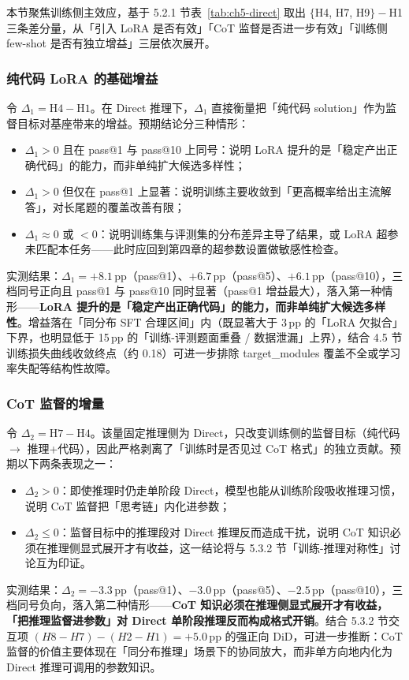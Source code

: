 
本节聚焦训练侧主效应，基于 5.2.1 节表~\ref{tab:ch5-direct} 取出 $\{$H4, H7, H9$\} - $H1 三条差分量，从「引入 LoRA 是否有效」「CoT 监督是否进一步有效」「训练侧 few-shot 是否有独立增益」三层依次展开。

\subsubsection{纯代码 LoRA 的基础增益}
令 $\Delta_1 = \mathrm{H4} - \mathrm{H1}$。在 Direct 推理下，$\Delta_1$ 直接衡量把「纯代码 solution」作为监督目标对基座带来的增益。预期结论分三种情形：
\begin{itemize}
    \item $\Delta_1 > 0$ 且在 pass@1 与 pass@10 上同号：说明 LoRA 提升的是「稳定产出正确代码」的能力，而非单纯扩大候选多样性；
    \item $\Delta_1 > 0$ 但仅在 pass@1 上显著：说明训练主要收敛到「更高概率给出主流解答」，对长尾题的覆盖改善有限；
    \item $\Delta_1 \approx 0$ 或 $< 0$：说明训练集与评测集的分布差异主导了结果，或 LoRA 超参未匹配本任务——此时应回到第四章的超参数设置做敏感性检查。
\end{itemize}
实测结果：$\Delta_1 = +8.1$\,pp（pass@1）、$+6.7$\,pp（pass@5）、$+6.1$\,pp（pass@10），三档同号正向且 pass@1 与 pass@10 同时显著（pass@1 增益最大），落入第一种情形——\textbf{LoRA 提升的是「稳定产出正确代码」的能力，而非单纯扩大候选多样性}。增益落在「同分布 SFT 合理区间」内（既显著大于 3\,pp 的「LoRA 欠拟合」下界，也明显低于 15\,pp 的「训练-评测题面重叠 / 数据泄漏」上界），结合 4.5 节训练损失曲线收敛终点（约 0.18）可进一步排除 target\_modules 覆盖不全或学习率失配等结构性故障。

\subsubsection{CoT 监督的增量}
令 $\Delta_2 = \mathrm{H7} - \mathrm{H4}$。该量固定推理侧为 Direct，只改变训练侧的监督目标（纯代码 $\to$ 推理+代码），因此严格剥离了「训练时是否见过 CoT 格式」的独立贡献。预期以下两条表现之一：
\begin{itemize}
    \item $\Delta_2 > 0$：即使推理时仍走单阶段 Direct，模型也能从训练阶段吸收推理习惯，说明 CoT 监督把「思考链」内化进参数；
    \item $\Delta_2 \le 0$：监督目标中的推理段对 Direct 推理反而造成干扰，说明 CoT 知识必须在推理侧显式展开才有收益，这一结论将与 5.3.2 节「训练-推理对称性」讨论互为印证。
\end{itemize}
实测结果：$\Delta_2 = -3.3$\,pp（pass@1）、$-3.0$\,pp（pass@5）、$-2.5$\,pp（pass@10），三档同号负向，落入第二种情形——\textbf{CoT 知识必须在推理侧显式展开才有收益，「把推理监督进参数」对 Direct 单阶段推理反而构成格式开销}。结合 5.3.2 节交互项 $(H8-H7)-(H2-H1)=+5.0$\,pp 的强正向 DiD，可进一步推断：CoT 监督的价值主要体现在「同分布推理」场景下的协同放大，而非单方向地内化为 Direct 推理可调用的参数知识。

